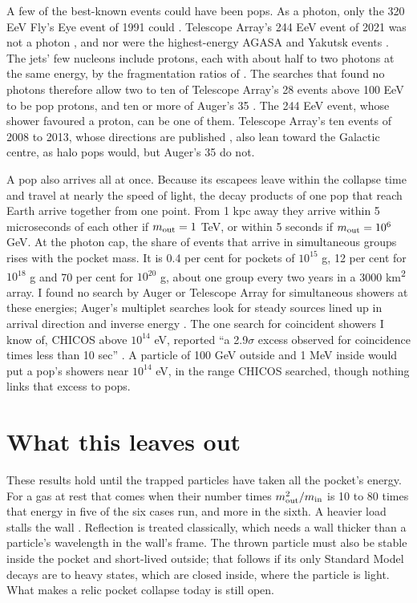\documentclass[10pt,twocolumn,a4paper]{article}
\begin{document}
A few of the best-known events could have been pops. As a photon, only the 320 EeV Fly's Eye event
of 1991 could \citep{Risse2006}. Telescope Array's 244 EeV event of 2021 was not a photon
\citep{TelescopeArrayCollaboration2023}, and nor were the highest-energy AGASA and Yakutsk events
\citep{Rubtsov2006}. The jets' few nucleons include protons, each with about half to two photons at
the same energy, by the fragmentation ratios of \citet{Aloisio2004}. The searches that found no
photons therefore allow two to ten of Telescope Array's 28 events above 100 EeV to be pop protons,
and ten or more of Auger's 35
\citep{TelescopeArrayCollaboration2026,PierreAugerCollaboration2022,PierreAugerCollaboration2023b}.
The 244 EeV event, whose shower favoured a proton, can be one of them. Telescope Array's ten events
of 2008 to 2013, whose directions are published \citep{TelescopeArrayCollaboration2014}, also lean
toward the Galactic centre, as halo pops would, but Auger's 35 do not.

A pop also arrives all at once. Because its escapees leave within the collapse time and travel at
nearly the speed of light, the decay products of one pop that reach Earth arrive together from one
point. From 1 kpc away they arrive within 5 microseconds of each other if $m_{\rm out} = 1$ TeV, or
within 5 seconds if $m_{\rm out} = 10^6$ GeV. At the photon cap, the share of events that arrive in
simultaneous groups rises with the pocket mass. It is 0.4 per cent for pockets of $10^{15}$ g, 12
per cent for $10^{18}$ g and 70 per cent for $10^{20}$ g, about one group every two years in a 3000
km\textsuperscript{2} array. I found no search by Auger or Telescope Array for simultaneous showers
at these energies; Auger's multiplet searches look for steady sources lined up in arrival direction
and inverse energy \citep{PierreAugerCollaboration2012}. The one search for coincident showers I
know of, CHICOS above $10^{14}$ eV, reported ``a 2.9$\sigma$ excess observed for coincidence times
less than 10 \textmu{}sec'' \citep{Carlson2005}. A particle of 100 GeV outside and 1 MeV inside
would put a pop's showers near $10^{14}$ eV, in the range CHICOS searched, though nothing links that
excess to pops.

\section{What this leaves out}

These results hold until the trapped particles have taken all the pocket's energy. For a gas at rest
that comes when their number times $m_{\rm out}^2/m_{\rm in}$ is 10 to 80 times that energy in five
of the six cases run, and more in the sixth. A heavier load stalls the wall \citep{Lewicki2023}.
Reflection is treated classically, which needs a wall thicker than a particle's wavelength in the
wall's frame. The thrown particle must also be stable inside the pocket and short-lived outside;
that follows if its only Standard Model decays are to heavy states, which are closed inside, where
the particle is light. What makes a relic pocket collapse today is still open.
\end{document}
